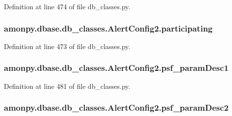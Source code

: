Definition at line 474 of file db\-\_\-classes.\-py.

\hypertarget{classamonpy_1_1dbase_1_1db__classes_1_1_alert_config2_a67a684e25c13f332b83baf748be6650d}{
\subsubsection[{participating}]{\setlength{\rightskip}{0pt plus 5cm}amonpy.\-dbase.\-db\-\_\-classes.\-Alert\-Config2.\-participating}}\label{classamonpy_1_1dbase_1_1db__classes_1_1_alert_config2_a67a684e25c13f332b83baf748be6650d}


Definition at line 473 of file db\-\_\-classes.\-py.

\hypertarget{classamonpy_1_1dbase_1_1db__classes_1_1_alert_config2_af6d4d813406bf61fab7cd1d2de01766e}{
\subsubsection[{psf\-\_\-param\-Desc1}]{\setlength{\rightskip}{0pt plus 5cm}amonpy.\-dbase.\-db\-\_\-classes.\-Alert\-Config2.\-psf\-\_\-param\-Desc1}}\label{classamonpy_1_1dbase_1_1db__classes_1_1_alert_config2_af6d4d813406bf61fab7cd1d2de01766e}


Definition at line 481 of file db\-\_\-classes.\-py.

\hypertarget{classamonpy_1_1dbase_1_1db__classes_1_1_alert_config2_a8d604b6d92c7d6d1aa5d5a71e87c2f81}{
\subsubsection[{psf\-\_\-param\-Desc2}]{\setlength{\rightskip}{0pt plus 5cm}amonpy.\-dbase.\-db\-\_\-classes.\-Alert\-Config2.\-psf\-\_\-param\-Desc2}}\label{classamonpy_1_1dbase_1_1db__classes_1_1_alert_config2_a8d604b6d92c7d6d1aa5d5a71e87c2f81}


